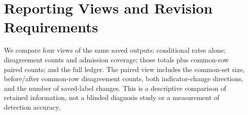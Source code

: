 \documentclass[11pt]{article}
\begin{document}
\begin{table}[t]
\centering
\small
\caption{Selected exploratory robustness results. Notation follows
Table~\ref{tab:matched-contrasts}. Changed is $(b+c)/n$ in percent with
Wilson 95\% intervals. Each alternative has its own 16-comparison Holm
family; $p_H^*$ does not account for post-hoc selection of alternatives.
The original strict results remain primary.}
\label{tab:matched-sensitivity}
\setlength{\tabcolsep}{4pt}
\end{table}

\section{Reporting Views and Revision Requirements}
\label{sec:reporting-comparison}

We compare four views of the same saved outputs: conditional rates alone;
disagreement counts and admission coverage; those totals plus common-row
paired counts; and the full ledger. The paired view includes the common-set
size, before/after common-row disagreement counts, both indicator-change
directions, and the number of saved-label changes. This is a descriptive
comparison of retained information, not a blinded diagnosis study or a
measurement of detection accuracy.
\end{document}
